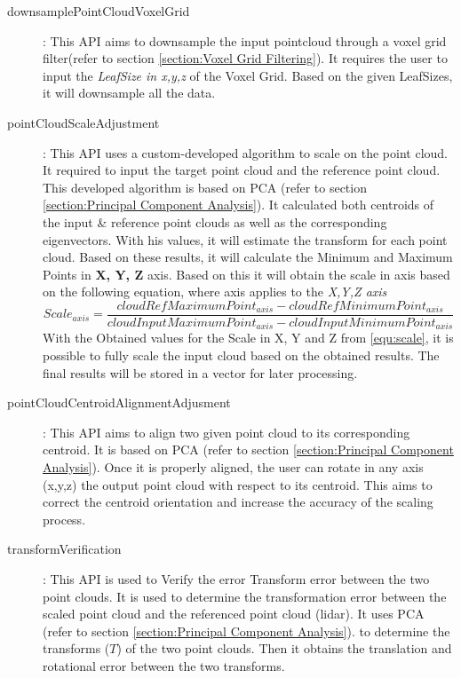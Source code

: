 \documentclass[12pt]{report}
\begin{document}
\begin{description}
   \item[downsamplePointCloudVoxelGrid] : This API aims to downsample the input pointcloud through a voxel grid  filter(refer to section \ref{section:Voxel Grid Filtering}). 
   It requires the user to input the \textit{LeafSize in x,y,z} of the Voxel Grid. Based on the given LeafSizes, it will downsample all the data.
   \item[pointCloudScaleAdjustment]: This API uses a custom-developed algorithm to scale on the point cloud. It required to input the target point cloud and the reference point cloud. 
   This developed algorithm is based on PCA (refer to section \ref{section:Principal Component Analysis}). It calculated both centroids of the input \& reference point clouds as well as the corresponding eigenvectors. With his values, it will estimate the transform for each point cloud. Based on these results, it will calculate the Minimum and Maximum Points in \textbf{X, Y, Z} axis.
   Based on this it will obtain the scale in axis based on the following equation, where axis applies to the \textit{X,Y,Z axis}
   \begin{equation}
     Scale_{axis} =  \frac{cloudRefMaximumPoint_{axis}-cloudRefMinimumPoint_{axis}}{cloudInputMaximumPoint_{axis}-cloudInputMinimumPoint_{axis}}
     \label{equ:scale}
   \end{equation}
With the Obtained values for the Scale in X, Y and Z from \ref{equ:scale}, it is possible to fully scale the input cloud based on the obtained results. The final results will be stored in a vector for later processing. 
   \item[pointCloudCentroidAlignmentAdjusment]: This API aims to align two given point cloud to its corresponding centroid. It is based on PCA (refer to section \ref{section:Principal Component Analysis}). Once it is properly aligned, the user can rotate in any axis (x,y,z) the output point cloud with respect to its centroid. This aims to correct the centroid orientation and increase the accuracy of the scaling process. 
   \item[transformVerification]: This API is used to Verify the error Transform error between the two point clouds. It is used to determine the transformation error between the scaled point cloud and the referenced point cloud (lidar).
   It uses PCA (refer to section \ref{section:Principal Component Analysis}). to determine the transforms ($T$) of the two point clouds. Then it obtains the translation and rotational error between the two transforms. 
   

\end{description}
\end{document}
